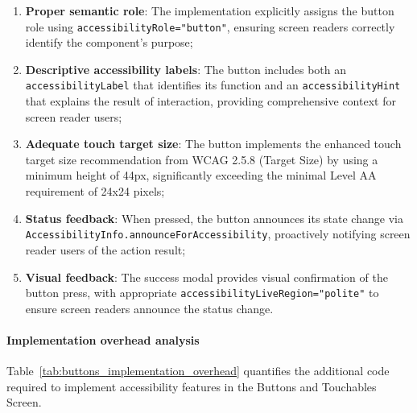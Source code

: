 \begin{enumerate}
    \item \textbf{Proper semantic role}: The implementation explicitly assigns the button role using \texttt{accessibilityRole="button"}, ensuring screen readers correctly identify the component's purpose;
    
    \item \textbf{Descriptive accessibility labels}: The button includes both an \texttt{accessibilityLabel} that identifies its function and an \texttt{accessibilityHint} that explains the result of interaction, providing comprehensive context for screen reader users;
    
    \item \textbf{Adequate touch target size}: The button implements the enhanced touch target size recommendation from WCAG 2.5.8 (Target Size) by using a minimum height of 44px, significantly exceeding the minimal Level AA requirement of 24x24 pixels;
    
    \item \textbf{Status feedback}: When pressed, the button announces its state change via \\\texttt{AccessibilityInfo.announceForAccessibility}, proactively notifying screen reader users of the action result;
    
    \item \textbf{Visual feedback}: The success modal provides visual confirmation of the button press, with appropriate \texttt{accessibilityLiveRegion="polite"} to ensure screen readers announce the status change.
\end{enumerate}

\paragraph{Implementation overhead analysis}

Table~\ref{tab:buttons_implementation_overhead} quantifies the additional code required to implement accessibility features in the Buttons and Touchables Screen.

